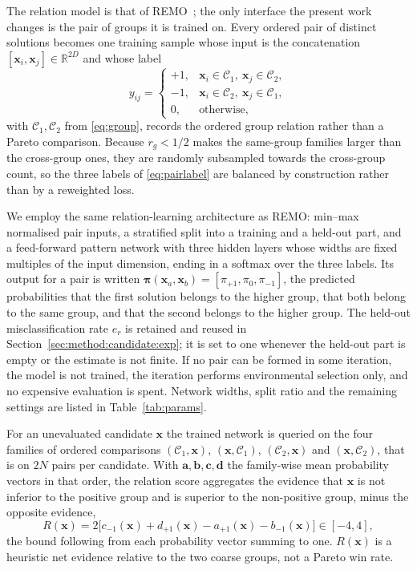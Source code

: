 \documentclass[final,5p,times,twocolumn]{elsarticle}
\newcommand{\vx}{\mathbf{x}}
\begin{document}
The relation model is that of REMO~\cite{ref:remo}; the only interface the
present work changes is the pair of groups it is trained on. Every ordered pair
of distinct solutions becomes one training sample whose input is the
concatenation $[\vx_i,\vx_j]\in\mathbb{R}^{2D}$ and whose label
\begin{equation}
y_{ij}=
\begin{cases}
+1, & \vx_i\in\mathcal{C}_1,\ \vx_j\in\mathcal{C}_2,\\
-1, & \vx_i\in\mathcal{C}_2,\ \vx_j\in\mathcal{C}_1,\\
0,  & \text{otherwise},
\end{cases}
\label{eq:pairlabel}
\end{equation}
with $\mathcal{C}_1,\mathcal{C}_2$ from \eqref{eq:group}, records the ordered
group relation rather than a Pareto comparison. Because $r_g<1/2$ makes the
same-group families larger than the cross-group ones, they are randomly
subsampled towards the cross-group count, so the three labels of
\eqref{eq:pairlabel} are balanced by construction rather than by a reweighted
loss.

We employ the same relation-learning architecture as REMO: min--max normalised
pair inputs, a stratified split into a training and a held-out part, and a
feed-forward pattern network with three hidden layers whose widths are fixed
multiples of the input dimension, ending in a softmax over the three labels.
Its output for a pair is written
$\bm{\pi}(\vx_a,\vx_b)=[\pi_{+1},\pi_0,\pi_{-1}]$, the predicted probabilities
that the first solution belongs to the higher group, that both belong to the
same group, and that the second belongs to the higher group. The held-out
misclassification rate $e_r$ is retained and reused in
Section~\ref{sec:method:candidate:exp}; it is set to one whenever the held-out
part is empty or the estimate is not finite. If no pair can be formed in some
iteration, the model is not trained, the iteration performs environmental
selection only, and no expensive evaluation is spent. Network widths, split
ratio and the remaining settings are listed in Table~\ref{tab:params}.

For an unevaluated candidate $\vx$ the trained network is queried on the four
families of ordered comparisons $(\mathcal{C}_1,\vx)$, $(\vx,\mathcal{C}_1)$,
$(\mathcal{C}_2,\vx)$ and $(\vx,\mathcal{C}_2)$, that is on $2N$ pairs per
candidate. With $\mathbf{a},\mathbf{b},\mathbf{c},\mathbf{d}$ the family-wise
mean probability vectors in that order, the relation score aggregates the
evidence that $\vx$ is not inferior to the positive group and is superior to the
non-positive group, minus the opposite evidence,
\begin{equation}
R(\vx)=2\bigl[c_{-1}(\vx)+d_{+1}(\vx)-a_{+1}(\vx)-b_{-1}(\vx)\bigr]
\in[-4,4],
\label{eq:relscore}
\end{equation}
the bound following from each probability vector summing to one. $R(\vx)$ is a
heuristic net evidence relative to the two coarse groups, not a Pareto win rate.
\end{document}
